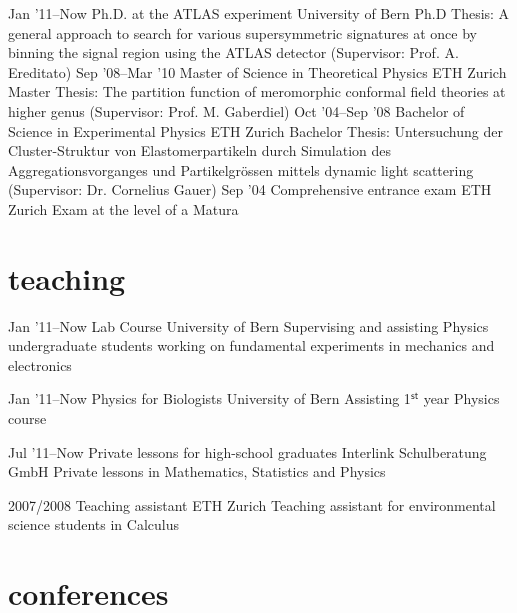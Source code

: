 \documentclass[]{cv} %
\begin{document}
\begin{entrylist}
\entry
{Jan '11--Now}
{Ph.D. {\normalfont at the} ATLAS experiment}
{University of Bern}
{Ph.D Thesis: A general approach to search for various supersymmetric signatures at once by binning the signal region using the ATLAS detector (Supervisor:
Prof. A. Ereditato)}
\entry
{Sep '08--Mar '10}
{Master {\normalfont of Science in} Theoretical Physics}
{ETH Zurich}
{Master Thesis: The partition function of meromorphic conformal field theories at higher genus (Supervisor: Prof. M. Gaberdiel)}
\entry
{Oct '04--Sep '08}
{Bachelor {\normalfont of Science in} Experimental Physics}
{ETH Zurich}
{Bachelor Thesis: Untersuchung der Cluster-Struktur von Elastomerpartikeln durch Simulation des Aggregationsvorganges und Partikelgr{\"o}ssen mittels dynamic
light scattering (Supervisor: Dr. Cornelius Gauer)}
\entry
{Sep '04}
{Comprehensive entrance exam}
{ETH Zurich}
{Exam at the level of a Matura}
\end{entrylist}

\section{teaching}

\begin{entrylist}

\entry
{Jan '11--Now}
{Lab Course}
{University of Bern}
{Supervising and assisting Physics undergraduate students working on fundamental experiments in mechanics and electronics}

\entry
{Jan '11--Now}
{Physics for Biologists}
{University of Bern}
{Assisting 1$^\mathsf{st}$ year Physics course}

\entry
{Jul '11--Now}
{Private lessons for high-school graduates}
{Interlink Schulberatung GmbH}
{Private lessons in Mathematics, Statistics and Physics}

\entry
{2007/2008}
{Teaching assistant}
{ETH Zurich}
{Teaching assistant for environmental science students in Calculus}

\end{entrylist}

\section{conferences}
\end{document}
